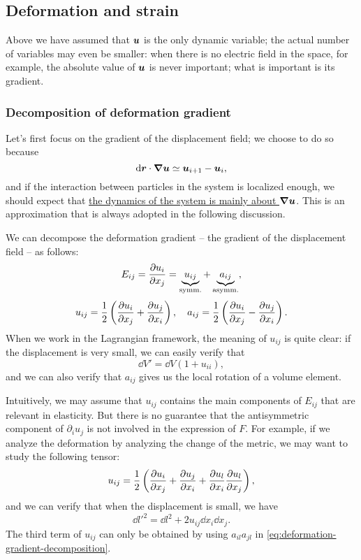\documentclass[hyperref, a4paper]{article}
\begin{document}
\subsection{Deformation and strain}

Above we have assumed that $\vb*{u}$ is the only dynamic variable; 
the actual number of variables may even be smaller: 
when there is no electric field in the space, for example, 
the absolute value of $\vb*{u}$ is never important; 
what is important is its gradient.

\subsubsection{Decomposition of deformation gradient}

Let's first focus on the gradient of the displacement field;
we choose to do so because 
\[
    \dd{\vb*{r}} \cdot \grad \vb*{u} \simeq \vb*{u}_{i + 1} - \vb*{u}_i,
\]
and if the interaction between particles in the system 
is localized enough, we should expect 
that \ul{the dynamics of the system is mainly about $\grad{\vb*{u}}$}.
This is an approximation that is always adopted 
in the following discussion. 

We can decompose the deformation gradient -- 
the gradient of the displacement field -- as follows:
\begin{equation}
    E_{ij} = \pdv{u_i}{x_j} = \underbrace{u_{ij}}_{\text{symm.}} + \underbrace{a_{ij}}_{\text{asymm.}} ,
\end{equation}
\begin{equation}
    u_{ij} = \frac{1}{2} \left(
        \pdv{u_i}{x_j} + \pdv{u_j}{x_i}
    \right) , \quad 
    a_{ij} = \frac{1}{2} \left(
        \pdv{u_i}{x_j} - \pdv{u_j}{x_i}
    \right) .
    \label{eq:deformation-gradient-decomposition}
\end{equation}
When we work in the Lagrangian framework,
the meaning of $u_{ij}$ is quite clear: 
if the displacement is very small,
we can easily verify that 
\begin{equation}
    \dd{V'} = \dd{V} (1 + u_{ii}),
\end{equation}
and we can also verify that $a_{ij}$ gives us the local rotation 
of a volume element.

Intuitively, we may assume that $u_{ij}$ 
contains the main components of $E_{ij}$
that are relevant in elasticity.
But there is no guarantee 
that the antisymmetric component of $\partial_i u_j$ is not involved 
in the expression of $F$.
For example, if we analyze the deformation by 
analyzing the change of the metric,
we may want to study the following tensor: 
\begin{equation}
    u_{ij} = \frac{1}{2} \left(
        \pdv{u_i}{x_j} + \pdv{u_j}{x_i} + \pdv{u_l}{x_i} \pdv{u_l}{x_j}
    \right) ,
    \label{eq:nonlinear-strain}
\end{equation}
and we can verify that when the displacement is small, we have 
\begin{equation}
    \dd{l'}^2 = \dd{l}^2 + 2 u_{ij} \dd{x_i} \dd{x_j}.
\end{equation}
The third term of $u_{ij}$ can only be obtained by using $a_{il} a_{jl}$
in \eqref{eq:deformation-gradient-decomposition}.
\end{document}
